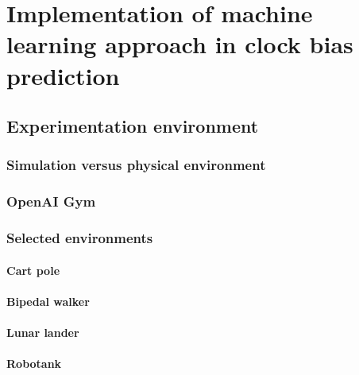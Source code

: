 \FloatBarrier
\chapter{Implementation of machine learning approach in clock bias prediction}


\FloatBarrier
\section{Experimentation environment}

\FloatBarrier
\subsection{Simulation versus physical environment}

\FloatBarrier
\subsection{OpenAI Gym}

\FloatBarrier
\subsection{Selected environments}

\FloatBarrier
\subsubsection{Cart pole}
\FloatBarrier
\subsubsection{Bipedal walker}
\FloatBarrier
\subsubsection{Lunar lander}
\FloatBarrier
\subsubsection{Robotank}

\FloatBarrier
